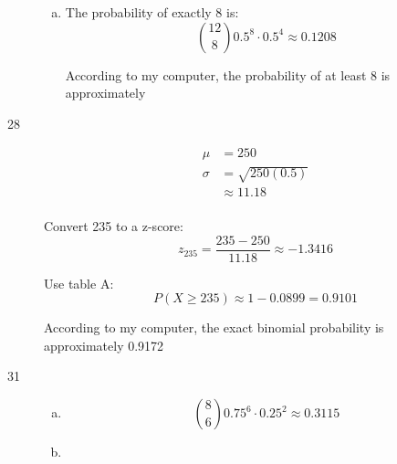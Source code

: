 \documentclass[letterpaper, landscape]{exam}
\begin{document}
\begin{description}
\begin{enumerate}[(a)]
          \item The probability of exactly 8 is:
            \[
              \binom{12}{8} 0.5^8 \cdot 0.5^4 \approx \boxed{ 0.1208 } 
            \]

            According to my computer, the probability of at least 8 is
            approximately 

        \end{enumerate}




      \item[28]
        \begin{align*}
          \mu    & = 250 \\
          \sigma & = \sqrt{250 (0.5)} \\
                 & \approx 11.18 \\
        \end{align*}

        Convert 235 to a z-score:
        \[
          z_{235} = \frac{235 - 250}{11.18} \approx -1.3416
        \]

        Use table A:
        \[
          P(X \geq 235) \approx 1 - 0.0899 = \boxed{ 0.9101 }
        \]

        According to my computer, the exact binomial probability is
        approximately 0.9172

      \item[31]
        \begin{enumerate}[(a)]
          \item 
            \[
              \binom{8}{6} 0.75^6 \cdot 0.25^2 \approx \boxed{ 0.3115 } 
            \]

          \item {}


\end{enumerate}
\end{description}
\end{document}
